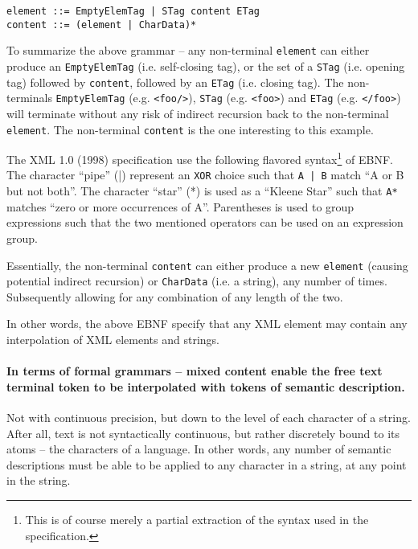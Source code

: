 \documentclass{scrreprt}
\begin{document}
\begin{lstlisting}
element ::= EmptyElemTag | STag content ETag 
content ::= (element | CharData)*
\end{lstlisting}

To summarize the above grammar -- any non-terminal \texttt{element} can either produce an \texttt{EmptyElemTag} (i.e. self-closing tag), or the set of a \texttt{STag} (i.e. opening tag) followed by \texttt{content}, followed by an \texttt{ETag} (i.e. closing tag). The non-terminals \texttt{EmptyElemTag} (e.g. \texttt{<foo/>}), \texttt{STag} (e.g. \texttt{<foo>}) and \texttt{ETag} (e.g. \texttt{</foo>}) will terminate without any risk of indirect recursion back to the non-terminal \texttt{element}. The non-terminal \texttt{content} is the one interesting to this example.

The XML 1.0 (1998) specification use the following flavored syntax\footnote{This is of course merely a partial extraction of the syntax used in the specification.} of EBNF. The character ``pipe'' (|) represent an \texttt{XOR} choice such that \texttt{A | B} match ``A or B but not both''. The character ``star'' (*) is used as a ``Kleene Star'' such that \texttt{A*} matches ``zero or more occurrences of A''. Parentheses is used to group expressions such that the two mentioned operators can be used on an expression group.

Essentially, the non-terminal \texttt{content} can either produce a new \texttt{element} (causing potential indirect recursion) or \texttt{CharData} (i.e. a string), any number of times. Subsequently allowing for any combination of any length of the two.

In other words, the above EBNF specify that any XML element may contain any interpolation of XML elements and strings.

\paragraph{In terms of formal grammars -- mixed content enable the free text terminal token to be interpolated with tokens of semantic description.} Not with continuous precision, but down to the level of each character of a string. After all, text is not syntactically continuous, but rather discretely bound to its atoms -- the characters of a language. In other words, any number of semantic descriptions must be able to be applied to any character in a string, at any point in the string.
\end{document}
